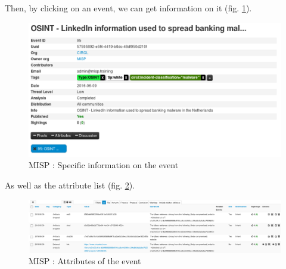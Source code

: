 \documentclass{eplmastersthesis}
\begin{document}
Then, by clicking on an event, we can get information on it (fig. \ref{webevent}).


\begin{figure}[!h]
	\begin{center}
		\includegraphics[scale=0.35]{res/webEvent}
		\caption{MISP : Specific information on the event}
		\label{webevent}
	\end{center}
\end{figure}


As well as the attribute list (fig. \ref{webattributes}).
\begin{figure}[!h]
	\begin{center}
		\includegraphics[scale=0.35]{res/webAttributes}
		\caption{MISP : Attributes of the event}
		\label{webattributes}
	\end{center}
\end{figure}
\end{document}
